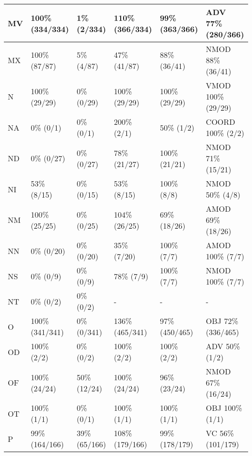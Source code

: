 \begin{figure*}
\begin{tabular}{|l|l|l|l|l|l|}
\hline
MV & 100\% (334/334) & 1\% (2/334) & 110\% (366/334) & 99\% (363/366) & ADV 77\% (280/366) \\ 
\hline
MX & 100\% (87/87) & 5\% (4/87) & 47\% (41/87) & 88\% (36/41) & NMOD 88\% (36/41) \\ 
\hline
N & 100\% (29/29) & 0\% (0/29) & 100\% (29/29) & 100\% (29/29) & VMOD 100\% (29/29) \\ 
\hline
NA & 0\% (0/1) & 0\% (0/1) & 200\% (2/1) & 50\% (1/2) & COORD 100\% (2/2) \\ 
\hline
ND & 0\% (0/27) & 0\% (0/27) & 78\% (21/27) & 100\% (21/21) & NMOD 71\% (15/21) \\ 
\hline
NI & 53\% (8/15) & 0\% (0/15) & 53\% (8/15) & 100\% (8/8) & NMOD 50\% (4/8) \\ 
\hline
NM & 100\% (25/25) & 0\% (0/25) & 104\% (26/25) & 69\% (18/26) & AMOD 69\% (18/26) \\ 
\hline
NN & 0\% (0/20) & 0\% (0/20) & 35\% (7/20) & 100\% (7/7) & AMOD 100\% (7/7) \\ 
\hline
NS & 0\% (0/9) & 0\% (0/9) & 78\% (7/9) & 100\% (7/7) & NMOD 100\% (7/7) \\ 
\hline
NT & 0\% (0/2) & 0\% (0/2) & - & - & - \\ 
\hline
O & 100\% (341/341) & 0\% (0/341) & 136\% (465/341) & 97\% (450/465) & OBJ 72\% (336/465) \\ 
\hline
OD & 100\% (2/2) & 0\% (0/2) & 100\% (2/2) & 100\% (2/2) & ADV 50\% (1/2) \\ 
\hline
OF & 100\% (24/24) & 50\% (12/24) & 100\% (24/24) & 96\% (23/24) & NMOD 67\% (16/24) \\ 
\hline
OT & 100\% (1/1) & 0\% (0/1) & 100\% (1/1) & 100\% (1/1) & OBJ 100\% (1/1) \\ 
\hline
P & 99\% (164/166) & 39\% (65/166) & 108\% (179/166) & 99\% (178/179) & VC 56\% (101/179) \\ 
\hline
\end{tabular}
\end{figure*}
